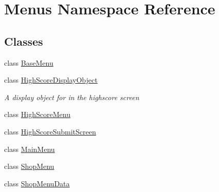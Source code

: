 \hypertarget{namespace_menus}{}\section{Menus Namespace Reference}
\label{namespace_menus}
\subsection*{Classes}
\begin{DoxyCompactItemize}
\item 
class \hyperlink{class_menus_1_1_base_menu}{Base\+Menu}
\item 
class \hyperlink{class_menus_1_1_high_score_display_object}{High\+Score\+Display\+Object}
\begin{DoxyCompactList}\small\item\em A display object for in the highscore screen \end{DoxyCompactList}\item 
class \hyperlink{class_menus_1_1_high_score_menu}{High\+Score\+Menu}
\item 
class \hyperlink{class_menus_1_1_high_score_submit_screen}{High\+Score\+Submit\+Screen}
\item 
class \hyperlink{class_menus_1_1_main_menu}{Main\+Menu}
\item 
class \hyperlink{class_menus_1_1_shop_menu}{Shop\+Menu}
\item 
class \hyperlink{class_menus_1_1_shop_menu_data}{Shop\+Menu\+Data}
\end{DoxyCompactItemize}

